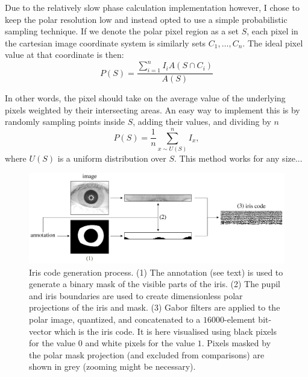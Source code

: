 Due to the relatively slow phase calculation implementation however, I chose to keep the polar resolution low and instead opted to use a simple probabilistic sampling technique. If we denote the polar pixel region as a set $S$, each pixel in the cartesian image coordinate system is similarly sets $C_1, \dots, C_n$. The ideal pixel value at that coordinate is then:
\begin{equation}
    P(S) = \frac{\sum_{i=1}^n I_i A(S\cap C_i)}{A(S)}
\end{equation}

In other words, the pixel should take on the average value of the underlying pixels weighted by their intersecting areas. An easy way to implement this is by randomly sampling points inside $S$, adding their values, and dividing by $n$
\begin{equation}
    P(S) = \frac{1}{n}\sum_{x \sim U(S)}^n I_{x},
\end{equation}
where $U(S)$ is a uniform distribution over $S$. This method works for any size...

\begin{figure}
    \centering
    \includegraphics[width=1\linewidth]{figures/iris-code-gen.pdf}
    \caption{Iris code generation process. (1) The annotation (see text) is used to generate a binary mask of the visible parts of the iris. (2) The pupil and iris boundaries are used to create dimensionless polar projections of the iris and mask. (3) Gabor filters are applied to the polar image, quantized, and concatenated to a $16000$-element bit-vector which is the iris code. It is here visualised using black pixels for the value $0$ and white pixels for the value $1$. Pixels masked by the polar mask projection (and excluded from comparisons) are shown in grey (zooming might be necessary). }
    \label{fig:iris-code-gen}
\end{figure}

